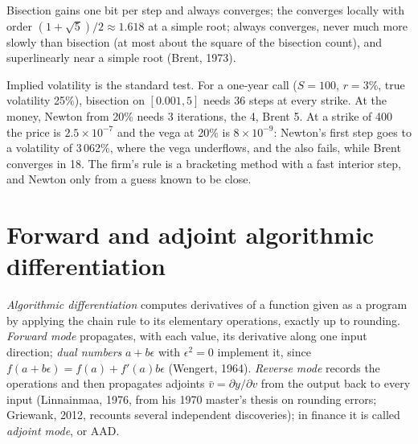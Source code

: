 \begin{proposition}\label{prop:qm:transforms-interpolation-and-algorithmic-differentiation:rootconv}
Bisection gains one bit per step and always converges; the  converges locally with order $(1 + \sqrt5)/2 \approx 1.618$ at a simple root;  always converges, never much more slowly than bisection
(at most about the square of the bisection count), and superlinearly near a simple root (Brent, 1973).
\end{proposition}

Implied volatility is the standard test. For a one-year call ($S = 100$, $r = 3\%$, true volatility 25\%), bisection on $[0.001, 5]$ needs 36 steps at every strike. At the money, Newton from 20\% needs 3
iterations, the  4, Brent 5. At a strike of 400 the price is $2.5 \times 10^{-7}$ and the vega at 20\% is $8 \times 10^{-9}$: Newton's first step goes to a volatility of 3\,062\%, where the vega
underflows, and the  also fails, while Brent converges in 18. The firm's rule is a bracketing method with a fast interior step, and Newton only from a guess known to be close.

\section{Forward and adjoint algorithmic differentiation}

\begin{definition}\label{def:qm:transforms-interpolation-and-algorithmic-differentiation:ad}
\emph{Algorithmic differentiation} computes derivatives of a function given as a program by applying the chain rule to its elementary operations, exactly up to
rounding. \emph{Forward mode} propagates, with each value, its derivative along one input direction; \emph{dual numbers} $a + b\epsilon$ with $\epsilon^2 = 0$ implement it,
since $f(a + b\epsilon) = f(a) + f'(a)b\epsilon$ (Wengert, 1964). \emph{Reverse mode} records the operations and then propagates adjoints $\bar v = \partial y/\partial v$ from the output back to
every input (Linnainmaa, 1976, from his 1970 master's thesis on rounding errors; Griewank, 2012, recounts several independent discoveries); in finance it is called \emph{adjoint mode}, or AAD.
\end{definition}

